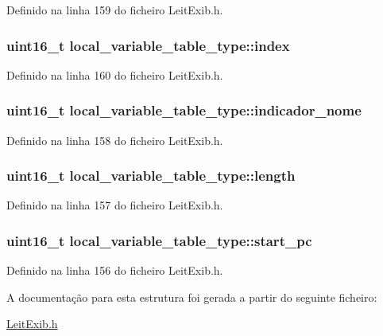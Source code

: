 Definido na linha 159 do ficheiro Leit\-Exib.\-h.

\hypertarget{structlocal__variable__table__type_a99e8d85f07bd570440689f229e4e0fa1}{
\subsubsection[{index}]{\setlength{\rightskip}{0pt plus 5cm}uint16\-\_\-t local\-\_\-variable\-\_\-table\-\_\-type\-::index}}\label{structlocal__variable__table__type_a99e8d85f07bd570440689f229e4e0fa1}


Definido na linha 160 do ficheiro Leit\-Exib.\-h.

\hypertarget{structlocal__variable__table__type_a2e30d42da683da1dfc3a45e07dde62ec}{
\subsubsection[{indicador\-\_\-nome}]{\setlength{\rightskip}{0pt plus 5cm}uint16\-\_\-t local\-\_\-variable\-\_\-table\-\_\-type\-::indicador\-\_\-nome}}\label{structlocal__variable__table__type_a2e30d42da683da1dfc3a45e07dde62ec}


Definido na linha 158 do ficheiro Leit\-Exib.\-h.

\hypertarget{structlocal__variable__table__type_a0dc62ed5079cc1226d9c254287009198}{
\subsubsection[{length}]{\setlength{\rightskip}{0pt plus 5cm}uint16\-\_\-t local\-\_\-variable\-\_\-table\-\_\-type\-::length}}\label{structlocal__variable__table__type_a0dc62ed5079cc1226d9c254287009198}


Definido na linha 157 do ficheiro Leit\-Exib.\-h.

\hypertarget{structlocal__variable__table__type_a560d45b628c0adaf0f1716b001d49379}{
\subsubsection[{start\-\_\-pc}]{\setlength{\rightskip}{0pt plus 5cm}uint16\-\_\-t local\-\_\-variable\-\_\-table\-\_\-type\-::start\-\_\-pc}}\label{structlocal__variable__table__type_a560d45b628c0adaf0f1716b001d49379}


Definido na linha 156 do ficheiro Leit\-Exib.\-h.



A documentação para esta estrutura foi gerada a partir do seguinte ficheiro\-:\begin{DoxyCompactItemize}
\item 
\hyperlink{_leit_exib_8h}{Leit\-Exib.\-h}\end{DoxyCompactItemize}
